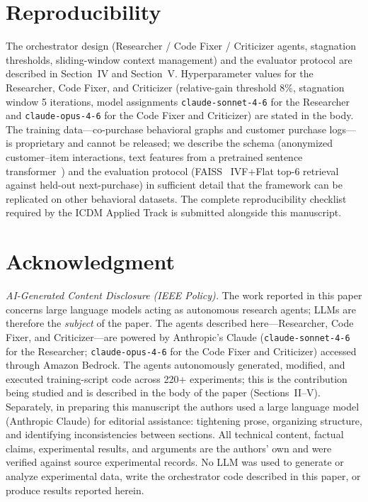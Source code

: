 \documentclass[conference]{IEEEtran}
\begin{document}
\section*{Reproducibility}

The orchestrator design (Researcher / Code Fixer / Criticizer agents, stagnation thresholds, sliding-window context management) and the evaluator protocol are described in Section~IV and Section~V. Hyperparameter values for the Researcher, Code Fixer, and Criticizer (relative-gain threshold 8\%, stagnation window 5 iterations, model assignments \texttt{claude-sonnet-4-6} for the Researcher and \texttt{claude-opus-4-6} for the Code Fixer and Criticizer) are stated in the body. The training data---co-purchase behavioral graphs and customer purchase logs---is proprietary and cannot be released; we describe the schema (anonymized customer--item interactions, text features from a pretrained sentence transformer~\cite{reimers2019sbert}) and the evaluation protocol (FAISS~\cite{johnson2019faiss} IVF+Flat top-6 retrieval against held-out next-purchase) in sufficient detail that the framework can be replicated on other behavioral datasets. The complete reproducibility checklist required by the ICDM Applied Track is submitted alongside this manuscript.

\section*{Acknowledgment}

\textit{AI-Generated Content Disclosure (IEEE Policy).} The work reported in this paper concerns large language models acting as autonomous research agents; LLMs are therefore the \emph{subject} of the paper. The agents described here---Researcher, Code Fixer, and Criticizer---are powered by Anthropic's Claude (\texttt{claude-sonnet-4-6} for the Researcher; \texttt{claude-opus-4-6} for the Code Fixer and Criticizer) accessed through Amazon Bedrock. The agents autonomously generated, modified, and executed training-script code across 220+ experiments; this is the contribution being studied and is described in the body of the paper (Sections~II--V). Separately, in preparing this manuscript the authors used a large language model (Anthropic Claude) for editorial assistance: tightening prose, organizing structure, and identifying inconsistencies between sections. All technical content, factual claims, experimental results, and arguments are the authors' own and were verified against source experimental records. No LLM was used to generate or analyze experimental data, write the orchestrator code described in this paper, or produce results reported herein.



\end{document}
